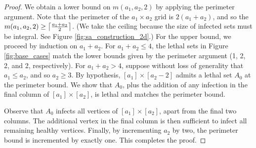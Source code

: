 \begin{proof}
We obtain a lower bound on $m(a_1,a_2,2)$ by applying the perimeter argument. Note that the perimeter of the $a_1 \times a_2$ grid is $2(a_1+a_2)$, and so the $m(a_1,a_2,2) \geq \ceil*{\frac{a_1+a_2}{2}}$. (We take the ceiling because the size of infected sets must be integral. See Figure \ref{fig:sa_construction_2d}.) For the upper bound, we proceed by induction on $a_1+a_2$. For $a_1+a_2 \leq 4$, the lethal sets in Figure \ref{fig:base_cases} match the lower bounds given by the perimeter argument (1, 2, 2, and 2, respectively). For $a_1+a_2 > 4$, suppose without loss of generality that $a_1 \leq a_2$, and so $a_2 \geq 3$. By hypothesis, $[a_1] \times [a_2-2]$ admits a lethal set $A_0$ at the perimeter bound. We show that $A_0$, plus the addition of any infection in the final column of $[a_1] \times [a_2]$, is lethal and matches the perimeter bound. 

Observe that $A_0$ infects all vertices of $[a_1] \times [a_2]$, apart from the final two columns. The additional vertex in the final column is then sufficient to infect all remaining healthy vertices. Finally, by incrementing $a_2$ by two, the perimeter bound is incremented by exactly one. This completes the proof.
\end{proof}


